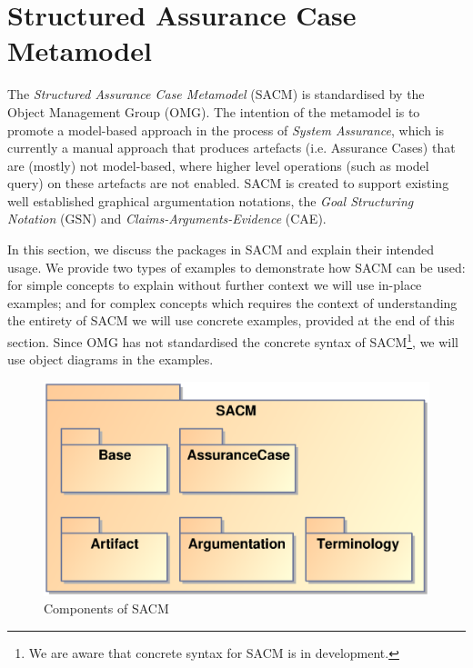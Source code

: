 \section{Structured Assurance Case Metamodel}
\label{sec:sacm}
The \textit{Structured Assurance Case Metamodel} (SACM) is standardised by the Object Management Group (OMG). 
The intention of the metamodel is to promote a model-based approach in the process of \textit{System Assurance}, which is currently a manual approach that produces artefacts (i.e. Assurance Cases) that are (mostly) not model-based, where higher level operations (such as model query) on these artefacts are not enabled. 
SACM is created to support existing well established graphical argumentation notations, the \textit{Goal Structuring Notation} (GSN) and \textit{Claims-Arguments-Evidence} (CAE). 


In this section, we discuss the packages in SACM and explain their intended usage. 
We provide two types of examples to demonstrate how SACM can be used: for simple concepts to explain without further context we will use in-place examples; and for complex concepts which requires the context of understanding the entirety of SACM we will use concrete examples, provided at the end of this section.
Since OMG has not standardised the concrete syntax of SACM\footnote{We are aware that concrete syntax for SACM is in development.}, we will use object diagrams in the examples. 

\begin{figure}[ht!]
	\centering
	\includegraphics[width=0.6\linewidth]{Overview.eps}
	\caption{Components of SACM}
	\label{fig:overview}
\end{figure}


